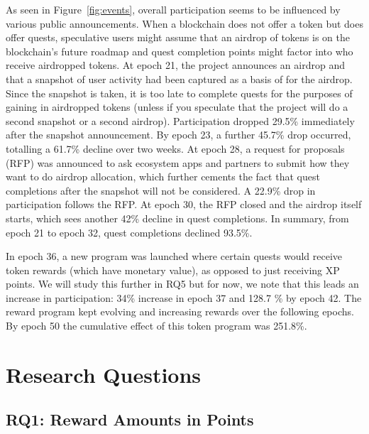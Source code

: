 As seen in  Figure~\ref{fig:events}, overall participation seems to be influenced by various public announcements. When a blockchain does not offer a token but does offer quests, speculative users might assume that an airdrop of tokens is on the blockchain's future roadmap and quest completion points might factor into who receive airdropped tokens. At epoch 21, the project announces an airdrop and that a snapshot of user activity had been captured as a basis of for the airdrop. Since the snapshot is taken, it is too late to complete quests for the purposes of gaining in airdropped tokens (unless if you speculate that the project will do a second snapshot or a second airdrop). Participation dropped 29.5\% immediately after the snapshot announcement. By epoch 23, a further 45.7\% drop occurred, totalling a 61.7\% decline over two weeks. At epoch 28, a request for proposals (RFP) was announced to ask ecosystem apps and partners to submit how they want to do airdrop allocation, which further cements the fact that quest completions after the snapshot will not be considered. A 22.9\% drop in participation follows the RFP. At epoch 30, the RFP closed and the airdrop itself starts, which sees another 42\% decline in quest completions. In summary, from epoch 21 to epoch 32, quest completions declined 93.5\%.  

In epoch 36, a new program was launched where certain quests would receive token rewards (which have monetary value), as opposed to just receiving XP points. We will study this further in RQ5 but for now, we note that this leads an increase in participation: 34\% increase in epoch 37 and 128.7 \% by epoch 42. The reward program kept evolving and increasing rewards over the following epochs. By epoch 50 the cumulative effect of this token program was 251.8\%.


\section{Research Questions}
\subsection{RQ1: Reward Amounts in Points}

